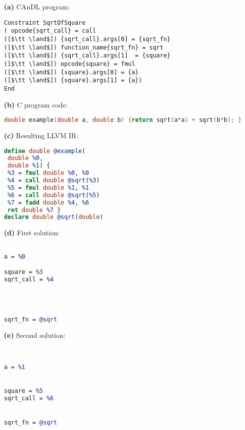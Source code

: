 \centering
\begin{minipage}[t]{0.67\textwidth}
\centering
{\bf(a)} CAnDL program:
\begin{lstlisting}[language=CAnDL]
Constraint SqrtOfSquare
( opcode{sqrt_call} = call
([$\tt \land$]) {sqrt_call}.args[0] = {sqrt_fn}
([$\tt \land$]) function_name{sqrt_fn} = sqrt
([$\tt \land$]) {sqrt_call}.args[1]  = {square}
([$\tt \land$]) opcode{square} = fmul
([$\tt \land$]) {square}.args[0] = {a}
([$\tt \land$]) {square}.args[1] = {a})
End
\end{lstlisting}
\end{minipage}

\vspace{1em}
\begin{minipage}[t]{\textwidth}
\centering
\begin{minipage}[t]{\textwidth}
\centering
{\bf(b)} C program code:
\begin{lstlisting}[numbers=none,framexleftmargin=0pt,xleftmargin=0pt,language=C,basicstyle=\small\ttfamily]
 double example(double a, double b) {return sqrt(a*a) + sqrt(b*b); }
\end{lstlisting}
\end{minipage}
\begin{minipage}[t]{7.1cm}
\centering
{\bf(c)} Resulting LLVM IR:
\begin{lstlisting}[language={LLVM}]
define double @example(    
 double %0,                
 double %1) {              
 %3 = fmul double %0, %0   
 %4 = call double @sqrt(%3)
 %5 = fmul double %1, %1   
 %6 = call double @sqrt(%5)
 %7 = fadd double %4, %6   
 ret double %7 }
declare double @sqrt(double)      
\end{lstlisting}
\end{minipage}
\hfill
\begin{minipage}[t]{3.5cm}
\centering
{\bf(d)} First solution:
\begin{lstlisting}[numbers=none,framexleftmargin=0pt,xleftmargin=0pt,language=LLVM]

a = %0

square = %3
sqrt_call = %4 




sqrt_fn = @sqrt
\end{lstlisting}
\end{minipage}
\hfill
\begin{minipage}[t]{3.5cm}
\centering
{\bf(e)} Second solution:
\begin{lstlisting}[numbers=none,framexleftmargin=0pt,xleftmargin=0pt,language=LLVM]


a = %1


square = %5
sqrt_call = %6


sqrt_fn = @sqrt
\end{lstlisting}
\end{minipage}
\end{minipage}


